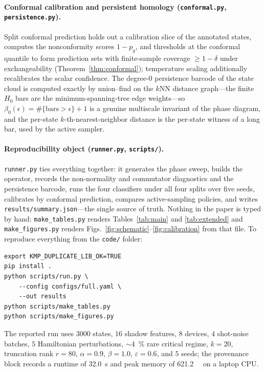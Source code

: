 \documentclass[aps,prresearch,reprint,amsmath,amssymb,nofootinbib,superscriptaddress,floatfix]{revtex4-2}
\theoremstyle{definition}
\theoremstyle{remark}
\theoremstyle{plain}
\begin{document}
\paragraph{Conformal calibration and persistent homology (\texttt{conformal.py}, \texttt{persistence.py}).}
Split conformal prediction holds out a calibration slice of the annotated states, computes the nonconformity
scores $1-p_y$, and thresholds at the conformal quantile to form prediction sets with finite-sample coverage
$\ge1-\delta$ under exchangeability (Theorem~\ref{thm:conformal}); temperature scaling additionally
recalibrates the scalar confidence. The degree-$0$ persistence barcode of the state cloud is computed
exactly by union--find on the $k$NN distance graph---the finite $H_0$ bars are the minimum-spanning-tree
edge weights---so $\beta_0(\epsilon)=\#\{\text{bars}>\epsilon\}+1$ is a genuine multiscale invariant of the
phase diagram, and the per-state $k$-th-nearest-neighbor distance is the per-state witness of a long bar,
used by the active sampler.

\paragraph{Reproducibility object (\texttt{runner.py}, \texttt{scripts/}).}
\texttt{runner.py} ties everything together: it generates the phase sweep, builds the operator, records the
non-normality and commutator diagnostics and the persistence barcode, runs the four classifiers under all
four splits over five seeds, calibrates by conformal prediction, compares active-sampling policies, and
writes \texttt{results/summary.json}---the single source of truth. Nothing in the paper is typed by hand:
\texttt{make\_tables.py} renders Tables~\ref{tab:main} and \ref{tab:extended} and \texttt{make\_figures.py}
renders Figs.~\ref{fig:schematic}--\ref{fig:calibration} from that file. To reproduce everything from the
\texttt{code/} folder:
\begin{verbatim}
export KMP_DUPLICATE_LIB_OK=TRUE
pip install .
python scripts/run.py \
    --config configs/full.yaml \
    --out results
python scripts/make_tables.py
python scripts/make_figures.py
\end{verbatim}
The reported run uses $\num{3000}$ states, $\num{16}$ shadow features, $\num{8}$ devices, $\num{4}$
shot-noise batches, $\num{5}$ Hamiltonian perturbations, $\sim$\SI{4}{\percent} rare critical regime,
$k=\num{20}$, truncation rank $r=\num{80}$, $\alpha=0.9$, $\beta=1.0$, $\varepsilon=0.6$, and $\num{5}$
seeds; the provenance block records a runtime of \SI{32.0}{\second} and peak memory of
\SI{621.2}{\mega\byte} on a laptop CPU.
\end{document}
